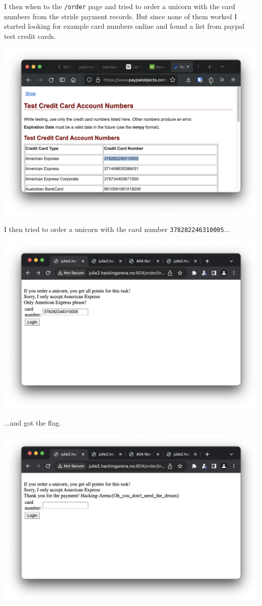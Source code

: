 I then when to the \texttt{/order} page and tried to order a unicorn with the card numbers from the stride payment records. But since none of them worked I started looking for example card numbers online and found a list from paypal test credit cards.

\begin{center}
    \includegraphics[width=15cm]{img/Web hacking/Order a Unicorn/Screenshot 2023-11-24 at 12.55.43.png}
\end{center}

I then tried to order a unicorn with the card number \texttt{378282246310005}...

\begin{center}
    \includegraphics[width=15cm]{img/Web hacking/Order a Unicorn/Screenshot 2023-11-24 at 12.55.22.png}
\end{center}

...and got the flag.

\begin{center}
    \includegraphics[width=15cm]{img/Web hacking/Order a Unicorn/Screenshot 2023-11-24 at 12.55.26.png}
\end{center}